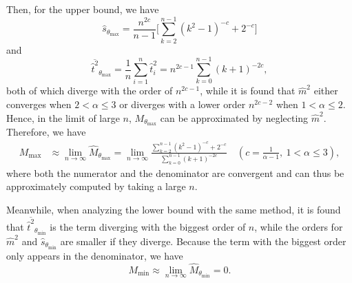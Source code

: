 Then, for the upper bound, we have
\begin{equation}
\hat{s}_{\theta_{\max}} = \frac{n^{2c}}{n-1} \big[ \sum_{k=2}^{n-1} (k^2-1)^{-c} + 2^{-c} \big]
\end{equation}
and
\begin{equation}
\overline{{\hat{t}}^2}_{\theta_{\max}} = \frac{1}{n} \sum_{i=1}^{n} \hat{t}_i^2 = n^{2c-1} \sum_{k=0}^{n-1} (k+1)^{-2c} ,
\end{equation}
both of which diverge with the order of $ n^{2c-1} $, while it is found that $ \hat{m}^2 $ either converges when $ 2 < \alpha \leq 3$ or diverges with a lower order $ n^{2c-2} $ when $ 1 < \alpha \leq 2 $. Hence, in the limit of large $ n $, $ M_{\theta_{\max}} $ can be approximated by neglecting $ \hat{m}^2 $. Therefore, we have
\begin{equation}
\begin{split}
	M_{\max} &\approx \lim_{n \rightarrow \infty} \hat{M}_{\theta_{\max}} = \lim_{n \rightarrow \infty} \frac{\sum_{k=2}^{n-1} (k^2-1)^{-c} + 2^{-c}}{\sum_{k=0}^{n-1} (k+1)^{-2c}} \quad (c=\frac{1}{\alpha-1},\ 1 < \alpha \leq 3),
\end{split} \label{eqs:mmax-approximate-theory}
\end{equation}
where both the numerator and the denominator are convergent and can thus be approximately computed by taking a large $ n $. 

Meanwhile, when analyzing the lower bound with the same method, it is found that 
$ \overline{{\hat{t}}^2}_{\theta_{\min}} $ is the term diverging with the biggest order of $ n $, while the orders for $ \hat{m}^2 $ and $ \hat{s}_{\theta_{\min}} $ are smaller if they diverge. Because the term with the biggest order only appears in the denominator, we have
\begin{equation}
	M_{\min} \approx \lim_{n \rightarrow \infty} \hat{M}_{\theta_{\min}} = 0.
\end{equation}

